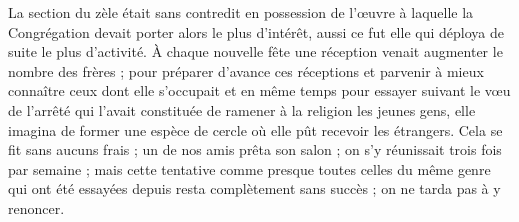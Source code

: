 La section du zèle était sans contredit en possession de l'œuvre à laquelle la Congrégation devait porter alors le plus d'intérêt, aussi ce fut elle qui déploya de suite le plus d'activité. À chaque nouvelle fête une réception venait augmenter le nombre des frères ; pour préparer d'avance ces réceptions et parvenir à mieux connaître ceux dont elle s'occupait et
en même temps pour essayer suivant le vœu de l'arrêté qui l'avait constituée de ramener à la religion les jeunes gens, elle imagina de former une espèce de cercle où elle pût recevoir les étrangers. Cela se fit sans aucuns frais ; un de nos amis prêta son salon ; on s'y réunissait trois fois par semaine ; mais cette tentative comme presque toutes celles du même genre qui ont été essayées depuis resta complètement sans succès ; on ne tarda pas à y renoncer.

